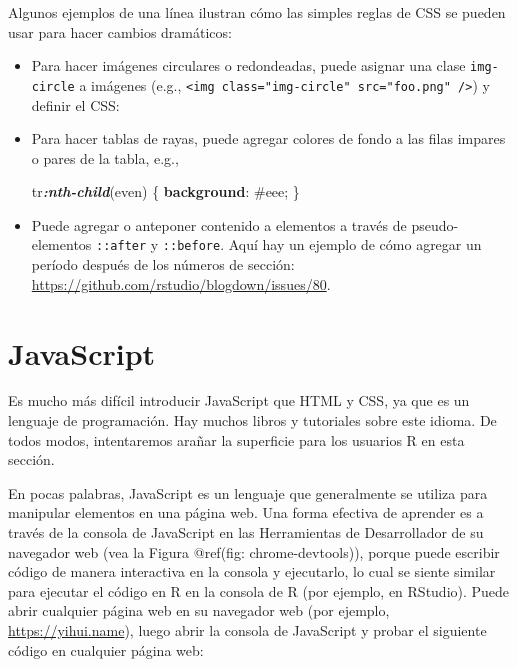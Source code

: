 \documentclass[12pt,]{krantz}
\makeatletter
\newenvironment{Shaded}{\begin{snugshade}}{\end{snugshade}}
\newcommand{\DecValTok}[1]{\textcolor[rgb]{0.00,0.00,0.81}{#1}}
\newcommand{\FunctionTok}[1]{\textcolor[rgb]{0.00,0.00,0.00}{#1}}
\newcommand{\InformationTok}[1]{\textcolor[rgb]{0.56,0.35,0.01}{\textbf{\textit{#1}}}}
\newcommand{\KeywordTok}[1]{\textcolor[rgb]{0.13,0.29,0.53}{\textbf{#1}}}
\newcommand{\NormalTok}[1]{#1}
\newenvironment{kframe}{%
\medskip{}
\setlength{\fboxsep}{.8em}
 \def\at@end@of@kframe{}%
 \ifinner\ifhmode%
  \def\at@end@of@kframe{\end{minipage}}%
  \begin{minipage}{\columnwidth}%
 \fi\fi%
 \def\FrameCommand##1{\hskip\@totalleftmargin \hskip-\fboxsep
 \colorbox{shadecolor}{##1}\hskip-\fboxsep
     \hskip-\linewidth \hskip-\@totalleftmargin \hskip\columnwidth}%
 \MakeFramed {\advance\hsize-\width
   \@totalleftmargin\z@ \linewidth\hsize
   \@setminipage}}%
 {\par\unskip\endMakeFramed%
 \at@end@of@kframe}
\renewenvironment{Shaded}{\begin{kframe}}{\end{kframe}}
\theoremstyle{definition}
\theoremstyle{definition}
\theoremstyle{definition}
\theoremstyle{remark}
\makeatother
\begin{document}
Algunos ejemplos de una línea ilustran cómo las simples reglas de CSS se
pueden usar para hacer cambios dramáticos:

\begin{itemize}
\item
  Para hacer imágenes circulares o redondeadas, puede asignar una clase
  \texttt{img-circle} a imágenes (e.g.,
  \texttt{\textless{}img\ class="img-circle"\ src="foo.png"\ /\textgreater{}})
  y definir el CSS:

\begin{Shaded}
\end{Shaded}
\item
  Para hacer tablas de rayas, puede agregar colores de fondo a las filas
  impares o pares de la tabla, e.g.,

\begin{Shaded}
\begin{Highlighting}[]
\NormalTok{tr}\InformationTok{:nth-child}\NormalTok{(even) \{}
  \KeywordTok{background}\NormalTok{: }\DecValTok{#eee}\NormalTok{;}
\NormalTok{\}}
\end{Highlighting}
\end{Shaded}
\item
  Puede agregar o anteponer contenido a elementos a través de
  pseudo-elementos \texttt{::after} y \texttt{::before}. Aquí hay un
  ejemplo de cómo agregar un período después de los números de sección:
  \url{https://github.com/rstudio/blogdown/issues/80}.
\end{itemize}

\hypertarget{javascript}{%
\section{JavaScript}\label{javascript}}

Es mucho más difícil introducir JavaScript  que HTML y
CSS, ya que es un lenguaje de programación. Hay muchos libros y
tutoriales sobre este idioma. De todos modos, intentaremos arañar la
superficie para los usuarios R en esta sección.

En pocas palabras, JavaScript es un lenguaje que generalmente se utiliza
para manipular elementos en una página web. Una forma efectiva de
aprender es a través de la consola de JavaScript en las Herramientas de
Desarrollador de su navegador web (vea la Figura @ref(fig:
chrome-devtools)), porque puede escribir código de manera interactiva en
la consola y ejecutarlo, lo cual se siente similar para ejecutar el
código en R en la consola de R (por ejemplo, en RStudio). Puede abrir
cualquier página web en su navegador web (por ejemplo,
\url{https://yihui.name}), luego abrir la consola de JavaScript y probar
el siguiente código en cualquier página web:
\end{document}
